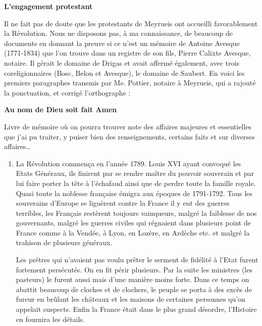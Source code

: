 {\fontsize{10.05}{11.45}\selectfont

\textbf{L’engagement protestant}

\vspace{0.35em}

Il ne fait pas de doute que les protestants de Meyrueis ont accueilli favorablement la
Révolution. Nous ne disposons pas, à ma connaissance, de beaucoup de documents en
donnant la preuve si ce n’est un mémoire de Antoine Avesque (1771-1834) que l’on trouve
dans un registre de son fils, Pierre Calixte Avesque, notaire. Il gérait le domaine de Drigas et
avait affermé également, avec trois coreligionnaires (Bosc, Belon et Avesque), le domaine de
Saubert. En voici les premiers paragraphes transmis par Me. Pottier, notaire à Meyrueis, qui a
rajouté la ponctuation, et corrigé l’orthographe :

\begin{center}
\textbf{Au nom de Dieu soit fait Amen}
\end{center}

Livre de mémoire où on pourra trouver note des affaires majeures et essentielles que j’ai pu traiter, y puiser
bien des renseignements, certains faits et sur diverses affaires…

\begin{enumerate}[label=\arabic*., leftmargin=2.0em, itemsep=0.55em, topsep=0.25em]
\item
La Révolution commença en l’année 1789. Louis XVI ayant convoqué les Etats Généraux, ils finirent
par se rendre maître du pouvoir souverain et par lui faire porter la tête à l’échafaud ainsi que de
perdre toute la famille royale. Quasi toute la noblesse française émigra aux époques de 1791-1792.
Tous les souverains d’Europe se liguèrent contre la France il y eut des guerres terribles, les Français
restèrent toujours vainqueurs, malgré la faiblesse de nos gouvernants, malgré les guerres civiles qui régnaient
dans plusieurs point de France comme à la Vendée, à Lyon, en Lozère, en Ardèche etc. et malgré la trahison de
plusieurs généraux.

Les prêtres qui n’avaient pas voulu prêter le serment de fidélité à l’Etat furent fortement persécutés. On en fit
périr plusieurs. Par la suite les ministres (les pasteurs) le furent aussi mais d’une manière moins forte.
Dans ce temps on abattit beaucoup de cloches et de clochers, le peuple se porta à des excès de fureur en brûlant
les châteaux et les maisons de certaines personnes qu’on appelait suspects. Enfin la France était dans le plus
grand désordre, l’Histoire en fournira les détails.


\end{enumerate}}
